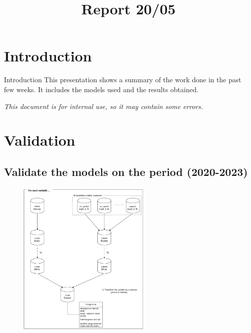 \documentclass[xcolor=dvipsnames]{beamer}
\title[Report 20/05]{Report 20/05}
\begin{document}
	
	\begin{frame}
		\titlepage
	\end{frame}
	

	\section{Introduction}

	\begin{frame}{Introduction}
        This presentation shows a summary of the work done in the past few weeks. It includes the models used and the results obtained.
        

        \textit{This document is for internal use, so it may contain some errors.}

	\end{frame}

    \section{Validation}



    \subsection{Validate the models on the period (2020-2023)}

    \begin{frame}
        \begin{figure}
            \centering
                 \includegraphics[width=0.57\textwidth]{images/diagram.png}
            \label{fig:series}
        \end{figure}
    \end{frame}
\end{document}

